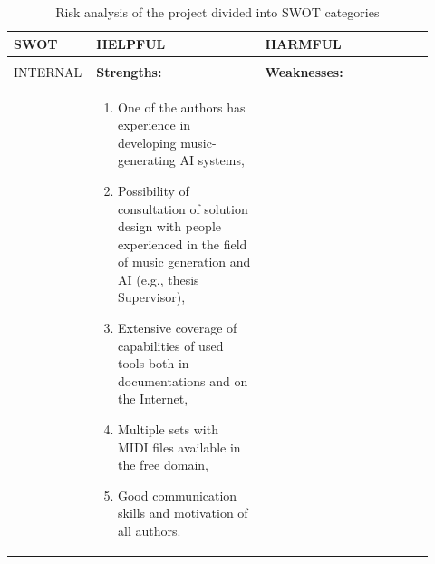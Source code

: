 \documentclass[a4paper, 11pt, twoside]{report}
\theoremstyle{definition}
\begin{document}
\begin{table}[H]
    \centering
    \caption{Risk analysis of the project divided into SWOT categories} \vskip16pt
    \label{tab:SWOT}
    \begin{tabular}{ |P{0.14\linewidth}|P{0.39\linewidth}|P{0.39\linewidth}| }
        \hline
        \textbf{SWOT}                                                                                                                                                                        & \setlength{\baselineskip}{14pt} HELPFUL                & \setlength{\baselineskip}{14pt} HARMFUL             \\
        \hline
        \setlength{\baselineskip}{14pt}                                                                                                                                                      &                                                        &                                                     \\
        \setlength{\baselineskip}{14pt}INTERNAL                                                                                                                                              & \setlength{\baselineskip}{14pt}\textbf{Strengths:}     & \setlength{\baselineskip}{14pt}\textbf{Weaknesses:} \\
        \setlength{\baselineskip}{14pt}                                                                                                                                                      &
        \setlength{\baselineskip}{14pt}\begin{enumerate}
                                           \setlength{\baselineskip}{14pt}    \item One of the authors has experience in developing music-generating AI systems,
                                                 \setlength{\baselineskip}{14pt}    \item Possibility of consultation of solution design with people experienced in the field of music generation and AI (e.g., thesis Supervisor),
                                                 \setlength{\baselineskip}{14pt}    \item Extensive coverage of capabilities of used tools both in documentations and on the Internet,
                                                 \setlength{\baselineskip}{14pt}    \item Multiple sets with MIDI files available in the free domain,
                                                 \setlength{\baselineskip}{14pt}    \item Good communication skills and motivation of all authors.

\end{enumerate}
\end{tabular}
\end{table}
\end{document}
